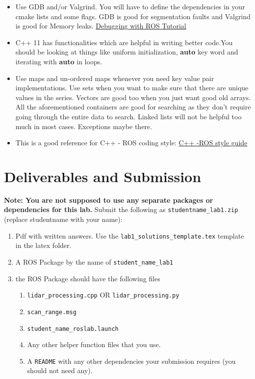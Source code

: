 \documentclass[letta4 paper]{article}
\numberwithin{equation}{section}
\newcommand{\0}{\mathbf{0}}
\begin{document}
\begin{enumerate}
	\begin{itemize}
		\item Use GDB and/or Valgrind. You will have to define the dependencies in your cmake lists and some flags. GDB is good for segmentation faults and Valgrind is good for Memory leaks.
		\href{http://wiki.ros.org/roslaunch/Tutorials/Roslaunch%20Nodes%20in%20Valgrind%20or%20GDB}{Debugging with ROS Tutorial}
			\item C++ 11 has functionalities which are helpful in writing better code.You should be looking at things like uniform initialization, \textbf{auto} key word and iterating with \textbf{auto} in loops. 
			\item Use maps and un-ordered maps whenever you need key value pair implementations. Use sets when you want to make sure that there are unique values in the series. Vectors are good too when you just want good old arrays. All the aforementioned containers are good for searching as they don't require going through the entire data to search. Linked lists will not be helpful too much in most cases. Exceptions maybe there.
			\item This is a good reference for C++ - ROS coding style: \href{http://wiki.ros.org/CppStyleGuide}{C++ -ROS style guide}
		\end{itemize}{}
	\end{enumerate}{}



	\section{Deliverables and Submission}
	\textbf{Note: You are not supposed to use any separate packages or dependencies for this lab. }
	Submit the following as \texttt{studentname\_lab1.zip} (replace studentname with your name):
	

	\begin{enumerate}
    \item Pdf with written answers. Use the \texttt{lab1\_solutions\_template.tex} template in the latex folder.
	\item A ROS Package by the name of \: \texttt{student\_name\_lab1 }
	\item the ROS Package should have the following files
	\begin{enumerate}
		\item \texttt{lidar\_processing.cpp} OR \texttt{lidar\_processing.py}
		\item \texttt{scan\_range.msg}
		\item \texttt{student\_name\_roslab.launch}
		\item Any other helper function files that you use.
		\item A \texttt{README} with any other dependencies your submission requires (you should not need any). 
	\end{enumerate}{}
	\end{enumerate}
\end{document}
